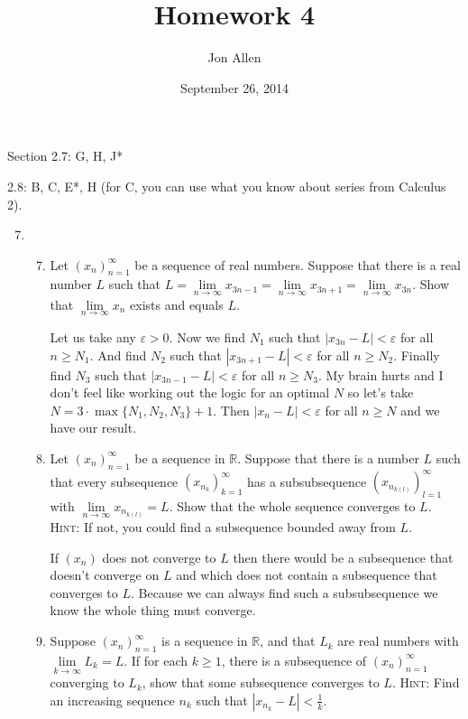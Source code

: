 \documentclass[letterpaper]{article}
\begin{document}
\title{Homework 4}
\date{September 26, 2014}
\author{Jon Allen}
\maketitle
Section 2.7: G, H, J*

2.8: B, C, E*, H (for C, you can use what you know about series from Calculus 2).
\renewcommand{\labelenumi}{2.\arabic{enumi}}
\renewcommand{\labelenumii}{\Alph{enumii}.}
\renewcommand{\labelenumiii}{(\alph{enumiii})}
\begin{enumerate}
\setcounter{enumi}{6}
\item
  \begin{enumerate}
  \setcounter{enumii}{6}
  \item
  Let $(x_{n})_{n=1}^\infty$ be a sequence of real numbers.
  Suppose that there is a real number $L$ such that $L=\lim\limits_{n\to\infty}{x_{3n-1}}=\lim\limits_{n\to\infty}{x_{3n+1}}=\lim\limits_{n\to\infty}{x_{3n}}$.
  Show that $\lim\limits_{n\to\infty}{x_n}$ exists and equals $L$.

  Let us take any $\varepsilon>0$.
  Now we find $N_1$ such that $\left\lvert x_{3n}-L\right\rvert<\varepsilon$ for all $n\ge N_1$.
  And find $N_2$ such that $\left\lvert x_{3n+1}-L\right\rvert<\varepsilon$ for all $n\ge N_2$. 
  Finally find $N_3$ such that $\left\lvert x_{3n-1}-L\right\rvert<\varepsilon$ for all $n\ge N_3$.
  My brain hurts and I don't feel like working out the logic for an optimal $N$ so let's take $N=3\cdot\max\{N_1,N_2,N_3\}+1$. Then $\left\lvert x_n-L\right\rvert<\varepsilon$ for all $n\ge N$ and we have our result.
  \item
  Let $(x_{n})_{n=1}^\infty$ be a sequence in $\mathbb{R}$.
  Suppose that there is a number $L$ such that every subsequence $\left(x_{n_k}\right)_{k=1}^\infty$ has a subsubsequence $\left(x_{n_{k(l)}}\right)_{l=1}^\infty$ with $\lim\limits_{n\to\infty}{x_{n_{k(l)}}=L}$. Show that the whole sequence converges to $L$. {\scshape  Hint:} If not, you could find a subsequence bounded away from $L$.

  If $(x_n)$ does not converge to $L$ then there would be a subsequence that doesn't converge on $L$ and which does not contain a subsequence that converges to $L$. Because we can always find such a subsubsequence we know the whole thing must converge.
  \setcounter{enumii}{9}
  \item
  Suppose $(x_n)_{n=1}^\infty$ is a sequence in $\mathbb{R}$, and that $L_k$ are real numbers with $\lim\limits_{k\to\infty}{L_k}=L$.
  If for each $k\ge1$, there is a subsequence of $(x_n)_{n=1}^\infty$ converging to $L_k$, show that some subsequence converges to $L$. {\scshape Hint:} Find an increasing sequence $n_k$ such that $\left\lvert x_{n_k}-L\right\rvert<\frac{1}{k}$.


\end{enumerate}
\end{enumerate}
\end{document}
